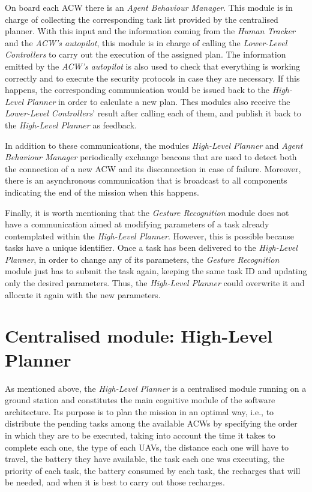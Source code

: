 On board each \gls{ACW} there is an \emph{Agent Behaviour Manager}. This module is in charge of collecting the corresponding task list provided by the centralised planner. With this input and the information coming from the \emph{Human Tracker} and the \emph{\gls{ACW}'s autopilot}, this module is in charge of calling the \emph{Lower-Level Controllers} to carry out the execution of the assigned plan. The information emitted by the \emph{\gls{ACW}'s autopilot} is also used to check that everything is working correctly and to execute the security protocols in case they are necessary. If this happens, the corresponding communication would be issued back to the \emph{High-Level Planner} in order to calculate a new plan. Thes modules also receive the \emph{Lower-Level Controllers}' result after calling each of them, and publish it back to the \emph{High-Level Planner} as feedback.

In addition to these communications, the modules \emph{High-Level Planner} and \emph{Agent Behaviour Manager} periodically exchange beacons that are used to detect both the connection of a new \gls{ACW} and its disconnection in case of failure. Moreover, there is an asynchronous communication that is broadcast to all components indicating the end of the mission when this happens.

Finally, it is worth mentioning that the \emph{Gesture Recognition} module does not have a communication aimed at modifying parameters of a task already contemplated within the \emph{High-Level Planner}. However, this is possible because tasks have a unique identifier. Once a task has been delivered to the \emph{High-Level Planner}, in order to change any of its parameters, the \emph{Gesture Recognition} module just has to submit the task again, keeping the same task \gls{ID} and updating only the desired parameters. Thus, the \emph{High-Level Planner} could overwrite it and allocate it again with the new parameters.

\section{Centralised module: High-Level Planner}
\label{sec:Centralized module:TaskPlanner}
As mentioned above, the \emph{High-Level Planner} is a centralised module running on a ground station and constitutes the main cognitive module of the software architecture. Its purpose is to plan the mission in an optimal way, i.e., to distribute the pending tasks among the available \glspl{ACW} by specifying the order in which they are to be executed, taking into account the time it takes to complete each one, the type of each \glspl{UAV}, the distance each one will have to travel, the battery they have available, the task each one was executing, the priority of each task, the battery consumed by each task, the recharges that will be needed, and when it is best to carry out those recharges.


